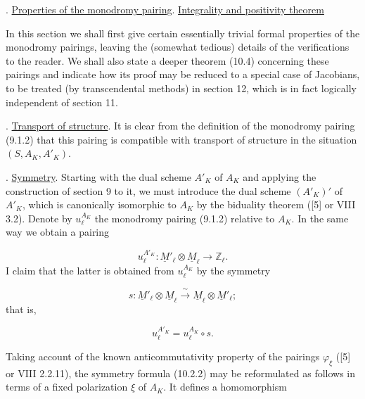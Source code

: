 
\medskip
{}. \underline{Properties of the monodromy pairing}. \underline{Integrality
and positivity theorem}

In this section we shall first give certain essentially trivial formal
properties of the monodromy pairings, leaving the (somewhat tedious)
details of the verifications to the reader. We shall also state a deeper
theorem (10.4) concerning these pairings and indicate how its proof may be
reduced to a special case of Jacobians, to be treated (by transcendental
methods) in section 12, which is in fact logically independent of section
11.

\medskip
{}. \underline{Transport of structure}. It is clear from the definition
of the monodromy pairing (9.1.2) that this pairing is compatible with
transport of structure in the situation $(S,A_K,A'_K)$.

\medskip
{}. \underline{Symmetry}. Starting with the dual scheme $A'_K$ of $A_K$
and applying the construction of section 9 to it, we must introduce the
dual scheme $(A'_K)'$ of $A'_K$, which is canonically isomorphic to $A_K$
by the biduality theorem ([5] or VIII 3.2). Denote by
$u_\ell^{A_K}$ the monodromy pairing (9.1.2) relative to $A_K$. In the same
way we obtain a pairing

\begin{equation}\tag{10.2.1}
u_\ell^{A'_K}:\underline M'_\ell\otimes\underline M_\ell
 \longrightarrow\mathbb Z_\ell.
\end{equation}
I claim that the latter is obtained from $u_\ell^{A_K}$ by the symmetry

\begin{equation*}
s:\underline M'_\ell\otimes\underline M_\ell
 \xrightarrow{\ \sim\ }
 \underline M_\ell\otimes\underline M'_\ell;
\end{equation*}
that is,

\begin{equation}\tag{10.2.2}
u_\ell^{A'_K}=u_\ell^{A_K}\circ s.
\end{equation}

Taking account of the known anticommutativity property of the pairings
$\varphi_\xi$ ([5] or VIII 2.2.11), the symmetry formula (10.2.2) may be
reformulated as follows in terms of a fixed polarization $\xi$ of $A_K$.
It defines a homomorphism

